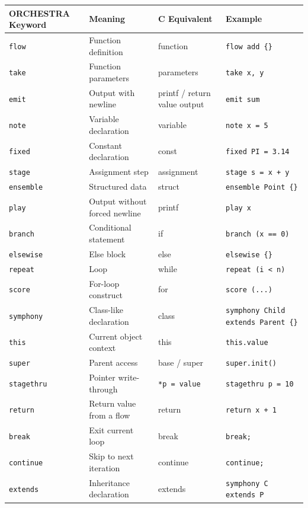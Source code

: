 \documentclass[12pt,a4paper]{article}
\begin{document}
\begin{table}[H]
\centering
\begin{tabularx}{\textwidth}{l >{\raggedright\arraybackslash}X >{\raggedright\arraybackslash}X >{\raggedright\arraybackslash}X}
\toprule
\textnormal{ORCHESTRA Keyword} & \textnormal{Meaning} & \textnormal{C Equivalent} & \textnormal{Example} \\
\midrule
\texttt{flow} & Function definition & function & \texttt{flow add \{\}} \\
\texttt{take} & Function parameters & parameters & \texttt{take x, y} \\
\texttt{emit} & Output with newline & printf / return value output & \texttt{emit sum} \\
\texttt{note} & Variable declaration & variable & \texttt{note x = 5} \\
\texttt{fixed} & Constant declaration & const & \texttt{fixed PI = 3.14} \\
\texttt{stage} & Assignment step & assignment & \texttt{stage s = x + y} \\
\texttt{ensemble} & Structured data & struct & \texttt{ensemble Point \{\}} \\
\texttt{play} & Output without forced newline & printf & \texttt{play x} \\
\texttt{branch} & Conditional statement & if & \texttt{branch (x == 0)} \\
\texttt{elsewise} & Else block & else & \texttt{elsewise \{\}} \\
\texttt{repeat} & Loop & while & \texttt{repeat (i < n)} \\
\texttt{score} & For-loop construct & for & \texttt{score (...)} \\
\texttt{symphony} & Class-like declaration & class & \texttt{symphony Child extends Parent \{\}} \\
\texttt{this} & Current object context & this & \texttt{this.value} \\
\texttt{super} & Parent access & base / super & \texttt{super.init()} \\
\texttt{stagethru} & Pointer write-through & \texttt{*p = value} & \texttt{stagethru p = 10} \\
\texttt{return} & Return value from a flow & return & \texttt{return x + 1} \\
\texttt{break} & Exit current loop & break & \texttt{break;} \\
\texttt{continue} & Skip to next iteration & continue & \texttt{continue;} \\
\texttt{extends} & Inheritance declaration & extends & \texttt{symphony C extends P} \\
\bottomrule
\end{tabularx}
\end{table}
\end{document}
